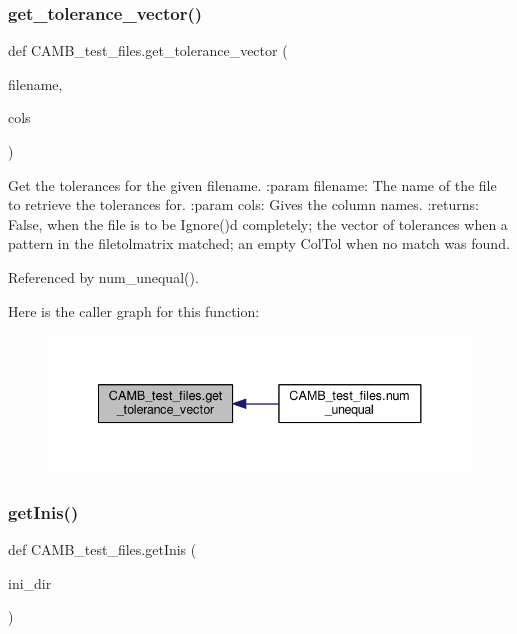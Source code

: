\subsubsection{\texorpdfstring{get\+\_\+tolerance\+\_\+vector()}{get\_tolerance\_vector()}}
{\footnotesize\ttfamily def C\+A\+M\+B\+\_\+test\+\_\+files.\+get\+\_\+tolerance\+\_\+vector (\begin{DoxyParamCaption}\item[{}]{filename,  }\item[{}]{cols }\end{DoxyParamCaption})}

\begin{DoxyVerb}Get the tolerances for the given filename.
:param filename: The name of the file to retrieve the tolerances for.
:param cols: Gives the column names.
:returns: False, when the file is to be Ignore()d completely;
the vector of tolerances when a pattern in the filetolmatrix matched;
an empty ColTol when no match was found.
\end{DoxyVerb}
 

Referenced by num\+\_\+unequal().

Here is the caller graph for this function\+:
\nopagebreak
\begin{figure}[H]
\begin{center}
\leavevmode
\includegraphics[width=338pt]{namespaceCAMB__test__files_a0191b8bd66eb62d12d53cb0c2267074e_icgraph}
\end{center}
\end{figure}
\mbox{\label{namespaceCAMB__test__files_aeb8138884c3f3796f817f15a04d3bbb2}} 
\subsubsection{\texorpdfstring{get\+Inis()}{getInis()}}
{\footnotesize\ttfamily def C\+A\+M\+B\+\_\+test\+\_\+files.\+get\+Inis (\begin{DoxyParamCaption}\item[{}]{ini\+\_\+dir }\end{DoxyParamCaption})}

